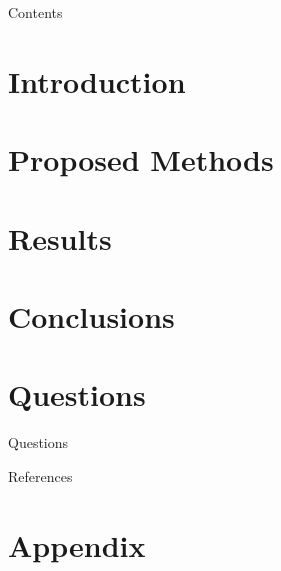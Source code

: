 \documentclass{beamer}
\begin{document}


\begin{frame}{Contents}
  \tableofcontents
\end{frame}

%
%

\section{Introduction}
\label{sec:introduction}


\section{Proposed Methods}
\label{sec:methods}


\section{Results}
\label{sec:results}


\section{Conclusions}
\label{sec:conclusions}


%
%
\section*{Questions}
\begin{frame}{Questions}
  \centering\scalebox{15}{?}
\end{frame}

\begin{frame}{References}
  
  
\end{frame}

\appendix
\section*{Appendix}

\end{document}
